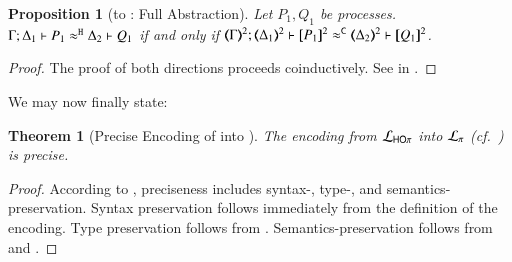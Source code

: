 \documentclass[preprint,11pt]{elsarticle}
\newtheorem{proposition}{Proposition}[section]
\newtheorem{theorem}{Theorem}[section]
\begin{document}
{\begin{proposition}[\HOp to \sessp: Full Abstraction]%
	\label{prop:fulla_HOp_to_p}
	Let $P_1, Q_1$ be \HOp processes.
	$\Gamma; \Delta_1 \vdash P_1 \approx^\mathtt{H} \Delta_2 \vdash Q_1$
	if and only if
	$\horel{\tmap{\Gamma}{2}}{\tmap{\Delta_1}{2}}{\pmap{P_1}{2}}{\fwb}{\tmap{\Delta_2}{2}}{\pmap{Q_1}{2}}$.
\end{proposition}

\begin{proof}
The proof of both directions proceeds coinductively.
See  in .
\end{proof}

We may now finally state:


\begin{theorem}[Precise Encoding of \HOp into \sessp]
\label{f:enc:hotopi}
The encoding from $\mathcal{L}_{\mathsf{HO}\pi}$ into $\mathcal{L}_{\pi}$ (cf.~)
is precise. 
\end{theorem}

\begin{proof}
According to , preciseness includes syntax-, type-, and semantics-preservation. 
Syntax preservation follows immediately from the definition of the encoding. 
Type preservation follows from 
.
Semantics-preservation follows from 	
 and 
.
\end{proof}

}
\end{document}
